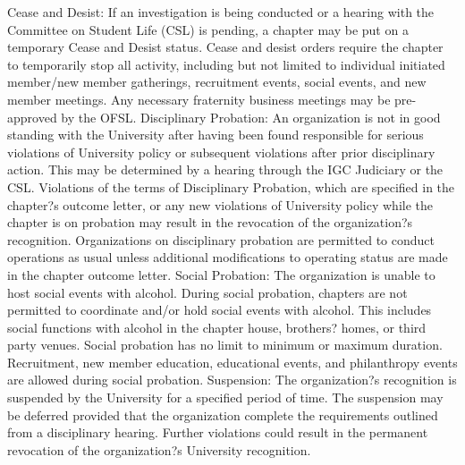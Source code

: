 \documentclass[12pt]{amsart}
\begin{document}
Cease and Desist: If an investigation is being conducted or a hearing with the Committee on Student Life (CSL) is pending, a chapter may be put on a temporary Cease and Desist status. Cease and desist orders require the chapter to temporarily stop all activity, including but not limited to individual initiated member/new member gatherings, recruitment events, social events, and new member meetings. Any necessary fraternity business meetings may be pre-approved by the OFSL.
Disciplinary Probation: An organization is not in good standing with the University after having been found responsible for serious violations of University policy or subsequent violations after prior disciplinary action. This may be determined by a hearing through the IGC Judiciary or the CSL. Violations of the terms of Disciplinary Probation, which are specified in the chapter?s outcome letter, or any new violations of University policy while the chapter is on probation may result in the revocation of the organization?s recognition.  Organizations on disciplinary probation are permitted to conduct operations as usual unless additional modifications to operating status are made in the chapter outcome letter.
Social Probation: The organization is unable to host social events with alcohol. During social probation, chapters are not permitted to coordinate and/or hold social events with alcohol. This includes social functions with alcohol in the chapter house, brothers? homes, or third party venues. Social probation has no limit to minimum or maximum duration. Recruitment, new member education, educational events, and philanthropy events are allowed during social probation.
Suspension: The organization?s recognition is suspended by the University for a specified period of time. The suspension may be deferred provided that the organization complete the requirements outlined from a disciplinary hearing. Further violations could result in the permanent revocation of the organization?s University recognition.
\subsection{}
\end{document}
